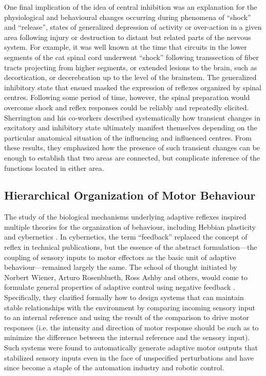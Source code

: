 One final implication of the idea of central inhibition was an explanation for the physiological and behavioural changes occurring during phenomena of ``shock'' and ``release'', states of generalized depression of activity or over-action in a given area following injury or destruction to distant but related parts of the nervous system. For example, it was well known at the time that circuits in the lower segments of the cat spinal cord underwent ``shock'' following transsection of fiber tracts projecting from higher segments, or extended lesions to the brain, such as decortication, or decerebration up to the level of the brainstem. The generalized inhibitory state that ensued masked the expression of reflexes organized by spinal centres. Following some period of time, however, the spinal preparation would overcome shock and reflex responses could be reliably and repeatedly elicited. Sherrington and his co-workers described systematically how transient changes in excitatory and inhibitory state ultimately manifest themselves depending on the particular anatomical situation of the influencing and influenced centres. From these results, they emphasized how the presence of such transient changes can be enough to establish that two areas are connected, but complicate inference of the functions located in either area.

\subsection{Hierarchical Organization of Motor Behaviour}

The study of the biological mechanisms underlying adaptive reflexes inspired multiple theories for the organization of behaviour, including Hebbian plasticity \cite{Hebb1949} and cybernetics \cite{Wiener1948}. In cybernetics, the term ``feedback'' replaced the concept of reflex in technical publications, but the essence of the abstract formulation---the coupling of sensory inputs to motor effectors as the basic unit of adaptive behaviour---remained largely the same. The school of thought initiated by Norbert Wiener, Arturo Rosenblueth, Ross Ashby and others, would come to formulate general properties of adaptive control using negative feedback \cite{Rosenblueth1943,Wiener1948,Ashby1960}. Specifically, they clarified formally how to design systems that can maintain stable relationships with the environment by comparing incoming sensory input to an internal reference and using the result of the comparison to drive motor responses (i.e. the intensity and direction of motor response should be such as to minimize the difference between the internal reference and the sensory input). Such systems were found to automatically generate adaptive motor outputs that stabilized sensory inputs even in the face of unspecified perturbations \cite{Wiener1948,Ashby1960} and have since become a staple of the automation industry and robotic control.

